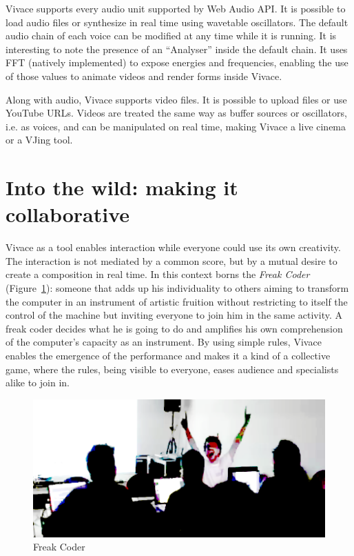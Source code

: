 \documentclass[letterpaper, 12pt]{article}
\begin{document}
Vivace supports every audio unit supported by Web Audio API. It is
possible to load audio files or synthesize in real time using
wavetable oscillators. The default audio chain of each voice can be
modified at any time while it is running. It is interesting to note
the presence of an ``Analyser'' inside the default chain. It uses FFT
(natively implemented) to expose energies and frequencies, 
enabling the use of those values to animate videos and render forms
inside Vivace.

Along with audio, Vivace supports video files. It is possible
to upload files or use YouTube URLs. Videos are treated the same way
as buffer sources or oscillators, i.e. as voices, and can be manipulated on
real time, making Vivace a live cinema or a VJing tool.

\section{Into the wild: making it collaborative}\label{sec:freakcoding}

Vivace as a tool enables interaction while everyone could use
its own creativity. The interaction is not 
mediated by a common score, but by a mutual desire
to create a composition in real time. In this context
borns the \emph{Freak Coder} (Figure~\ref{fig:freakcoder}): someone that adds
up his individuality to others aiming to transform the computer in an
instrument of artistic fruition without restricting to itself the control of the
machine but inviting everyone to join him in the
same activity. A freak coder decides what he is going to do and amplifies his own
comprehension of the computer's capacity as an instrument. By using simple
rules, Vivace enables the emergence of the performance and makes it a
kind of a collective game, where the rules, being visible to everyone,
eases audience and specialists alike to join in.

\begin{figure}[htpb]
  \begin{center}
    \includegraphics[scale=.4]{img/fig_freakcoder.png}
    \caption{Freak Coder}
    \label{fig:freakcoder}
  \end{center}
\end{figure}
\end{document}
